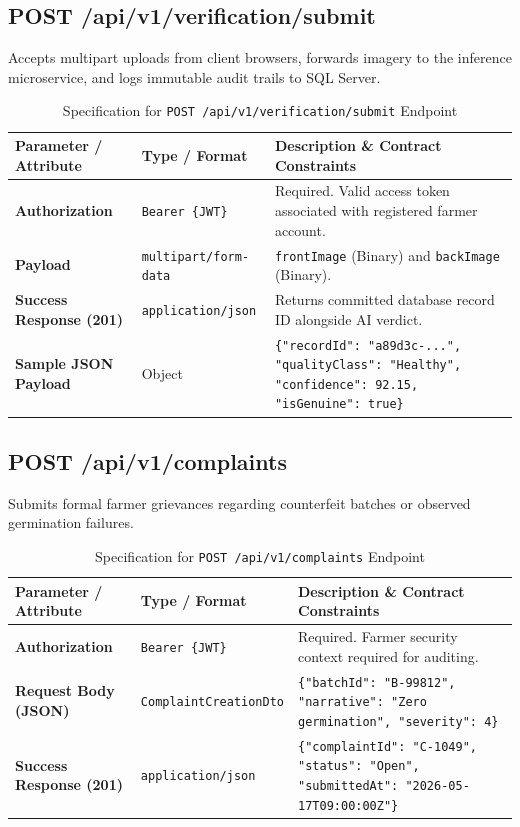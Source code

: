 \subsection*{POST /api/v1/verification/submit}
Accepts multipart uploads from client browsers, forwards imagery to the inference microservice, and logs immutable audit trails to SQL Server.

\begin{table}[htbp]
  \centering
  \caption{Specification for \texttt{POST /api/v1/verification/submit} Endpoint}
  \label{tab:api-verifysubmit}
  \renewcommand{\arraystretch}{1.35}
  \begin{tabularx}{\textwidth}{@{} l l X @{}}
    \toprule
    \textbf{Parameter / Attribute} & \textbf{Type / Format} & \textbf{Description \& Contract Constraints} \\
    \midrule
    \textbf{Authorization} & \texttt{Bearer \{JWT\}} & Required. Valid access token associated with registered farmer account. \\
    \addlinespace
    \textbf{Payload} & \texttt{multipart/form-data} & \texttt{frontImage} (Binary) and \texttt{backImage} (Binary). \\
    \addlinespace
    \textbf{Success Response (201)} & \texttt{application/json} & Returns committed database record ID alongside AI verdict. \\
    \addlinespace
    \textbf{Sample JSON Payload} & Object & \texttt{\{"recordId": "a89d3c-...", "qualityClass": "Healthy", "confidence": 92.15, "isGenuine": true\}} \\
    \bottomrule
  \end{tabularx}
\end{table}

\subsection*{POST /api/v1/complaints}
Submits formal farmer grievances regarding counterfeit batches or observed germination failures.

\begin{table}[htbp]
  \centering
  \caption{Specification for \texttt{POST /api/v1/complaints} Endpoint}
  \label{tab:api-complaintpost}
  \renewcommand{\arraystretch}{1.35}
  \begin{tabularx}{\textwidth}{@{} l l X @{}}
    \toprule
    \textbf{Parameter / Attribute} & \textbf{Type / Format} & \textbf{Description \& Contract Constraints} \\
    \midrule
    \textbf{Authorization} & \texttt{Bearer \{JWT\}} & Required. Farmer security context required for auditing. \\
    \addlinespace
    \textbf{Request Body (JSON)} & \texttt{ComplaintCreationDto} & \texttt{\{"batchId": "B-99812", "narrative": "Zero germination", "severity": 4\}} \\
    \addlinespace
    \textbf{Success Response (201)} & \texttt{application/json} & \texttt{\{"complaintId": "C-1049", "status": "Open", "submittedAt": "2026-05-17T09:00:00Z"\}} \\
    \bottomrule
  \end{tabularx}
\end{table}

